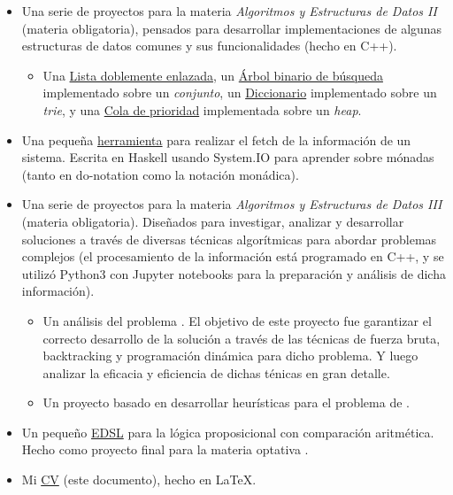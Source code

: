 \documentclass{article}
\begin{document}
\begin{itemize}
    \item Una serie de proyectos para la materia \textit{Algoritmos y Estructuras de Datos II} (materia obligatoria), pensados para desarrollar implementaciones de algunas estructuras de datos comunes y sus funcionalidades  (hecho en C++).
    \begin{itemize}
        \item Una \href{https://github.com/lucasDS-0/Doubly_Linked_List}{Lista doblemente enlazada}, un \href{https://github.com/lucasDS-0/BST_on_a_set}{Árbol binario de búsqueda} implementado sobre un \emph{conjunto}, un \href{https://github.com/lucasDS-0/Map_on_a_trie}{Diccionario} implementado sobre un \emph{trie}, y una \href{https://github.com/lucasDS-0/Priority_queue_on_a_heap}{Cola de prioridad} implementada sobre un \emph{heap}.
    \end{itemize}
    \item Una pequeña \href{https://github.com/lucasDS-0/hFetch}{herramienta} para realizar el fetch de la información de un sistema. Escrita en Haskell usando System.IO para aprender sobre mónadas (tanto en do-notation como la notación monádica).
    \item Una serie de proyectos para la materia \textit{Algoritmos y Estructuras de Datos III} (materia obligatoria). Diseñados para investigar, analizar y desarrollar soluciones a través de diversas técnicas algorítmicas para abordar problemas complejos (el procesamiento de la información está programado en C++, y se utilizó Python3 con Jupyter notebooks para la preparación y análisis de dicha información).
    \begin{itemize}
        \item Un análisis del problema . El objetivo de este proyecto fue garantizar el correcto desarrollo de la solución a través de las técnicas de fuerza bruta, backtracking y programación dinámica para dicho problema. Y luego analizar la eficacia y eficiencia de dichas ténicas en gran detalle.
        \item Un proyecto basado en desarrollar heurísticas para el problema de .
    \end{itemize}
    \item Un pequeño \href{https://github.com/lucasDS-0/ECI37_N1/tree/main}{EDSL} para la lógica proposicional con comparación aritmética. Hecho como proyecto final para la materia optativa .
    \item Mi \href{https://github.com/lucasDS-0/Resume}{CV} (este documento), hecho en \LaTeX.
\end{itemize}
\end{document}
